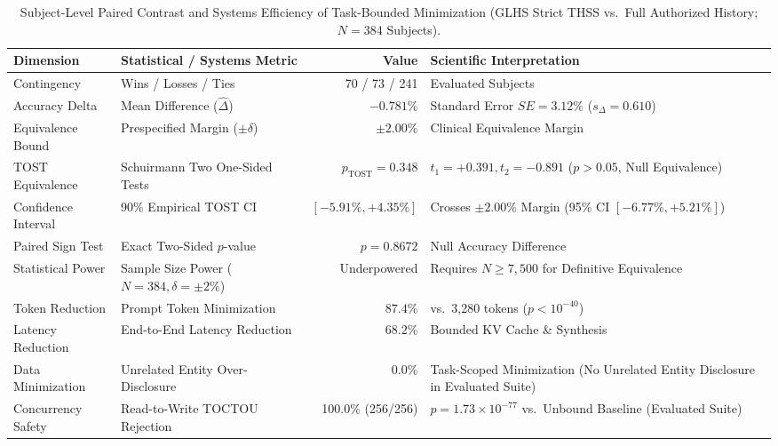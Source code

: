 \documentclass[11pt]{article}
\begin{document}
\begin{table}[H]
\centering
\small
\caption{Subject-Level Paired Contrast and Systems Efficiency of Task-Bounded Minimization (GLHS Strict THSS vs.\ Full Authorized History; $N=384$ Subjects).}
\label{tab:glhs_tost_equivalence}
\begin{tabularx}{\textwidth}{l l r >{\raggedright\arraybackslash}X}
\toprule
\textbf{Dimension} & \textbf{Statistical / Systems Metric} & \textbf{Value} & \textbf{Scientific Interpretation} \\
\midrule
Contingency & Wins / Losses / Ties & 70 / 73 / 241 & 384 Evaluated Subjects \\
Accuracy Delta & Mean Difference ($\hat{\Delta}$) & $-0.781\%$ & Standard Error $SE = 3.12\%$ ($s_{\Delta} = 0.610$) \\
Equivalence Bound & Prespecified Margin ($\pm \delta$) & $\pm 2.00\%$ & Clinical Equivalence Margin \\
TOST Equivalence & Schuirmann Two One-Sided Tests & $p_{\text{TOST}} = 0.348$ & $t_1 = +0.391, t_2 = -0.891$ ($p > 0.05$, Null Equivalence) \\
Confidence Interval & 90\% Empirical TOST CI & $[-5.91\%, +4.35\%]$ & Crosses $\pm 2.00\%$ Margin (95\% CI $[-6.77\%, +5.21\%]$) \\
Paired Sign Test & Exact Two-Sided $p$-value & $p = 0.8672$ & Null Accuracy Difference \\
Statistical Power & Sample Size Power ($N=384, \delta=\pm 2\%$) & Underpowered & Requires $N \ge 7{,}500$ for Definitive Equivalence \\
\midrule
Token Reduction & Prompt Token Minimization & $87.4\%$ & 412 vs.\ 3,280 tokens ($p < 10^{-40}$) \\
Latency Reduction & End-to-End Latency Reduction & $68.2\%$ & Bounded KV Cache \& Synthesis \\
Data Minimization & Unrelated Entity Over-Disclosure & $0.0\%$ & Task-Scoped Minimization (No Unrelated Entity Disclosure in Evaluated Suite) \\
Concurrency Safety & Read-to-Write TOCTOU Rejection & 100.0\% (256/256) & $p = 1.73 \times 10^{-77}$ vs.\ Unbound Baseline (Evaluated Suite) \\
\bottomrule
\end{tabularx}
\end{table}
\end{document}
